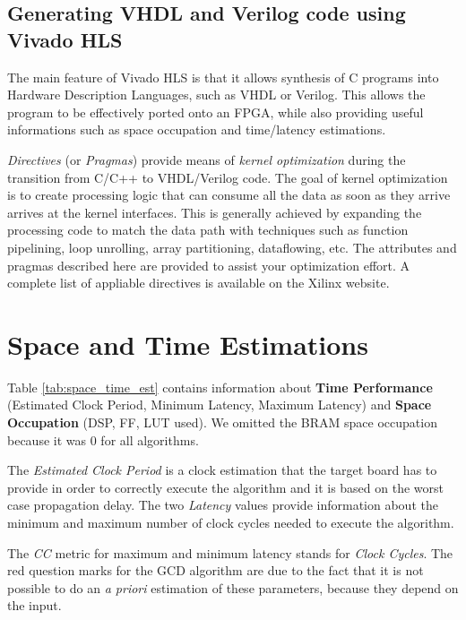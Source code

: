 \subsection{Generating VHDL and Verilog code using Vivado HLS}

The main feature of Vivado HLS is that it allows synthesis of C programs into Hardware Description Languages, such as VHDL or Verilog. This allows the program to be effectively ported onto an FPGA, while also providing useful informations such as space occupation and time/latency estimations.

\textit{Directives} (or \textit{Pragmas}) provide means of \emph{kernel optimization} during the transition from C/C++ to VHDL/Verilog code. The goal of kernel optimization is to create processing logic that can consume all the data as soon as they arrive arrives at the kernel interfaces. This is generally achieved by expanding the processing code to match the data path with techniques such as function pipelining, loop unrolling, array partitioning, dataflowing, etc. The attributes and pragmas described here are provided to assist your optimization effort. A complete list of appliable directives is available on the Xilinx website\cite{xilinx_directives}.

\newpage

\section{Space and Time Estimations}
\label{sec:spacetime_estimations}

Table \ref{tab:space_time_est} contains information about \textbf{Time Performance} (Estimated Clock Period, Minimum Latency, Maximum Latency) and \textbf{Space Occupation} (DSP, FF, LUT used). We omitted the BRAM space occupation because it was 0 for all algorithms.

The \emph{Estimated Clock Period} is a clock estimation that the target board has to provide in order to correctly execute the algorithm and it is based on the worst case propagation delay. The two \emph{Latency} values provide information about the minimum and maximum number of clock cycles needed to execute the algorithm.

The \textit{CC} metric for maximum and minimum latency stands for \textit{Clock Cycles}. The red question marks for the GCD algorithm are due to the fact that it is not possible to do an \textit{a priori} estimation of these parameters, because they depend on the input. 

